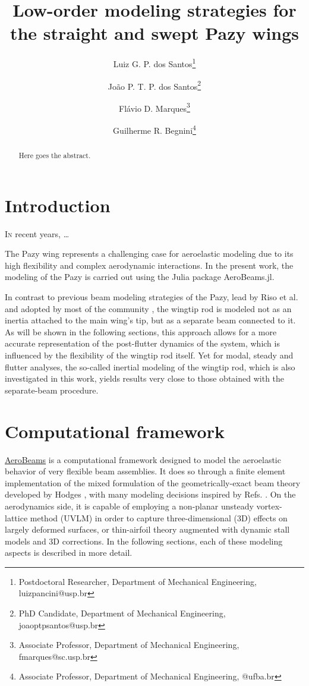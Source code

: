 \documentclass[journal]{new-aiaa}
\title{Low-order modeling strategies for the straight and swept Pazy wings}
\author{Luiz G. P. dos Santos\footnote{Postdoctoral Researcher, Department of Mechanical Engineering, luizpancini@usp.br}}
\author{João P. T. P. dos Santos\footnote{PhD Candidate, Department of Mechanical Engineering, joaoptpsantos@usp.br}}
\author{Flávio D. Marques\footnote{Associate Professor, Department of Mechanical Engineering, fmarques@sc.usp.br}}
\affil{São Carlos School of Engineering, University of São Paulo,  São Carlos, São Paulo, 13566590, Brazil}
\author{Guilherme R. Begnini\footnote{Associate Professor, Department of Mechanical Engineering, @ufba.br}}
\affil{Federal University of Bahia, Salvador, Bahia, 40210630, Brazil}
\begin{document}
\maketitle

\begin{abstract}
Here goes the abstract.
\end{abstract}

\section{Introduction}
\lettrine{I}{n} recent years, \dots

The Pazy wing represents a challenging case for aeroelastic modeling due to its high flexibility and complex aerodynamic interactions. In the present work, the modeling of the Pazy is carried out using the Julia package AeroBeams.jl.

In contrast to previous beam modeling strategies of the Pazy, lead by Riso et al. \cite{riso2021correlations,riso2022low} and adopted by most of the community \cite{ritter2026large}, the wingtip rod is modeled not as an inertia attached to the main wing's tip, but as a separate beam connected to it. As will be shown in the following sections, this approach allows for a more accurate representation of the post-flutter dynamics of the system, which is influenced by the flexibility of the wingtip rod itself. Yet for modal, steady and flutter analyses, the so-called inertial modeling of the wingtip rod, which is also investigated in this work, yields results very close to those obtained with the separate-beam procedure.

\section{Computational framework}

\href{https://github.com/luizpancini/AeroBeams.jl}{AeroBeams} is a computational framework designed to model the aeroelastic behavior of very flexible beam assemblies. It does so through a finite element implementation of the mixed formulation of the geometrically-exact beam theory developed by Hodges \cite{hodges2006nonlinear}, with many modeling decisions inspired by Refs. \cite{hodges1996finite,yu2012gebt,wang2017geometrically}. On the aerodynamics side, it is capable of employing a non-planar unsteady vortex-lattice method (UVLM) in order to capture three-dimensional (3D) effects on largely deformed surfaces, or thin-airfoil theory augmented with dynamic stall models and 3D corrections. In the following sections, each of these modeling aspects is described in more detail.
\end{document}
